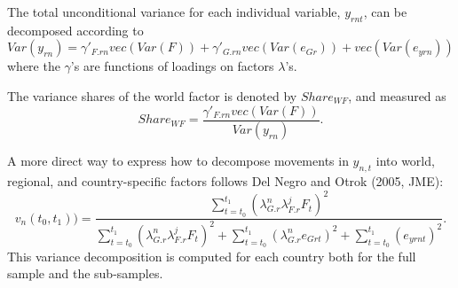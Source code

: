 \documentclass[12pt]{article}
\numberwithin{equation}{section}
\begin{document}
The total unconditional variance for each individual variable, $y_{rnt}$, can be decomposed according to
\begin{equation}
Var(y_{rn})=\gamma'_{F.rn}vec(Var(F))+\gamma'_{G.rn}vec(Var(e_{Gr}))+vec(Var(e_{yrn}))
\label{eq:VD_ng}
\end{equation}
where the $\gamma$'s are functions of loadings on factors $\lambda$'s.

The variance shares of the world factor is denoted by $Share_{WF}$, and measured as
\begin{equation}
Share_{WF}=\frac{\gamma'_{F.rn}vec(Var(F))}{Var(y_{rn})}.
\label{eq:VD_WF}
\end{equation}

A more direct way to express how to decompose movements in $y_{n,t}$ into world, regional, and country-specific factors follows Del Negro and Otrok (2005, JME):
\begin{equation}
v_n(t_0,t_1))=\frac{\sum_{t=t_0}^{t_1}(\lambda^n_{G.r}\lambda^j_{F.r}F_t)^2}{\sum_{t=t_0}^{t_1}(\lambda^n_{G.r}\lambda^j_{F.r}F_t)^2+\sum_{t=t_0}^{t_1}(\lambda^n_{G.r}e_{Grt})^2+\sum_{t=t_0}^{t_1}(e_{yrnt})^2}.
\label{eq:VD_negro}
\end{equation}
This variance decomposition is computed for each country both for the full sample and the sub-samples.
\end{document}

